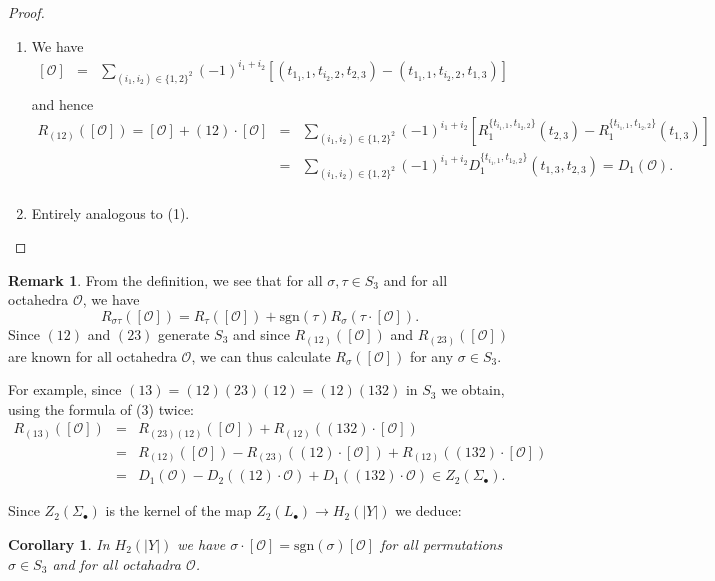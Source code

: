 \documentclass[12pt]{amsart}
\newtheorem{cor}[lem]{Corollary}
\theoremstyle{definition}
\newtheorem{rem}[lem]{Remark}
\newcommand{\oct}{\mathcal{O}}%
\newcommand{\cyc}[1]{\left[ #1\right]} %
\newcommand{\<}{\langle}
\renewcommand{\>}{\rangle}
\begin{document}
\begin{proof}\ \\
\begin{enumerate}
\item We have
\begin{eqnarray*}
\cyc{\oct}&=&  \sum_{(i_1,i_2)\in \{ 1,2\}^2}(-1)^{i_1+i_2}\left[ (t_{1_1,1},t_{i_2,2},t_{2,3})-(t_{1_1,1},t_{i_2,2},t_{1,3})\right]\\
\end{eqnarray*}
and hence
\begin{eqnarray*}
R_{(12)}(\cyc{\oct})=\cyc{\oct}+(12)\cdot\cyc{\oct}&=&\sum_{(i_1,i_2)\in \{ 1,2\}^2}(-1)^{i_1+i_2}\left[R_1^{\{ t_{i_1,1},t_{1_2,2}\}}(t_{2,3})-R_1^{\{ t_{i_1,1},t_{1_2,2}\}}(t_{1,3})\right]\\
&=&\sum_{(i_1,i_2)\in \{ 1,2\}^2}(-1)^{i_1+i_2} D_1^{\{ t_{i_1,1},t_{1_2,2}\}}(t_{1,3},t_{2,3})=D_1(\oct).\\
\end{eqnarray*}
\item Entirely analogous to (1).

\end{enumerate}
\end{proof}
\begin{rem}\label{rem:13}
 From the definition, we see that for all $\sigma,\tau\in S_3$ and for all octahedra $\oct$, we have
\[
R_{\sigma\tau}(\cyc{\oct})=R_{\tau}(\cyc{\oct})+\mathrm{sgn}(\tau)R_{\sigma}(\tau\cdot\cyc{\oct}).
\]
Since $(12)$ and $(23)$ generate $S_3$ and since $R_{(12)}(\cyc{\oct})$ and $R_{(23)}(\cyc{\oct})$ are known for all octahedra $\oct$, we can thus calculate $R_{\sigma}(\cyc{\oct})$ for any 
$\sigma\in S_3$.

For example, since $(13)=(12)(23)(12)=(12)(132)$ in $S_3$ we obtain, using the formula of (3) twice:
\begin{eqnarray*}
R_{(13)}(\cyc{\oct})&=& R_{(23)(12)}(\cyc{\oct})+R_{(12)}( (132)\cdot\cyc{\oct})\\
&=& R_{(12)}(\cyc{\oct})-R_{(23)}((12)\cdot\cyc{\oct})+R_{(12)}((132)\cdot\cyc{\oct})\\
&=& D_1(\oct)-D_2((12)\cdot\oct)+D_1((132)\cdot\oct)\in Z_2(\Sigma_\bullet).
\end{eqnarray*}
\end{rem}
Since $Z_2(\Sigma_\bullet)$ is the kernel of the map $Z_2(L_\bullet)\to H_2(|Y|)$ we deduce:
\begin{cor} In $H_2(|Y|)$ we have $\sigma\cdot\cyc{\oct}=\mathrm{sgn}(\sigma)\cyc{\oct}$ for all permutations $\sigma\in S_3$ and for all octahadra $\oct$. 
\end{cor}
\end{document}
